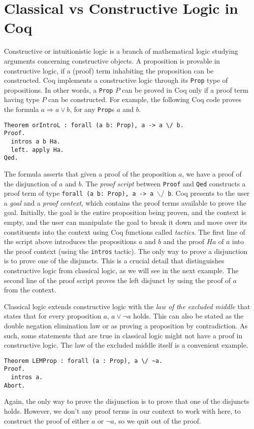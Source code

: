 \documentclass[11pt]{article}
\begin{document}
	\section{Classical vs Constructive Logic in Coq}
	\label{sec:logic}
	Constructive or intuitionistic logic 
	is a branch of mathematical logic 
	studying arguments concerning 
	constructive objects. A proposition 
	is provable in constructive logic, if 
	a (proof) term inhabiting the 
	proposition can be constructed. 
	Coq implements a constructive 
	logic through its \texttt{Prop}
	type of propositions. In other words,
	a \texttt{Prop} $P$ can be proved in 
	Coq only if a proof term having 
	type $P$ can be constructed.
	For example, the following Coq
	code proves the formula
	$a \Rightarrow a \lor b$, for any 
	\texttt{Prop}s $a$ and $b$.
	\begin{verbatim}
Theorem orIntroL : forall (a b: Prop), a -> a \/ b.
Proof.
  intros a b Ha.
  left. apply Ha.
Qed.
	\end{verbatim}
	The formula asserts that given a 
	proof of the proposition $a$, we
	have a proof of the 
	disjunction of $a$ and $b$. The 
	\textit{proof script} between 
	\texttt{Proof} 
	and \texttt{Qed} constructs a 
	proof term of type \texttt{forall 
	(a b: Prop), a -> a $\backslash/$ b}. 
	Coq presents to the user a 
	\textit{goal} and a \textit{proof 
	context}, which contains the proof 
	terms available to prove the goal.
	Initially, the goal is the entire 
	proposition being proven, and the 
	context is empty, and the user
	can manipulate the goal to break 
	it down and move over its 
	constituents into the context
	using Coq functions called 
	\textit{tactics}. The first line of the 
	script above introduces 
	the propositions $a$ and $b$ and the 
	proof $Ha$ of $a$ into the 
	proof context (using the \texttt{intros}
	tactic). The only way to prove a 
	disjunction is to prove one 
	of the disjuncts. This is a crucial
	detail that distinguishes constructive
	logic from classical logic, as we 
	will see in the next example. 
	The second line of the proof script 
	proves the left disjunct by using 
	the proof of $a$ from the context.
	
	Classical logic extends 
	constructive logic with the 
	\textit{law of the excluded 
	middle} that states that for 
	every proposition $a$, 
	$a \lor \neg a$ holds. This can 
	also be stated as the 
	double negation elimination 
	law or as proving a 
	proposition by contradiction. As
	such, some statements that are true 
	in classical logic might not have 
	a proof in constructive logic.
	The law of the excluded middle
	itself is a convenient example.
	\begin{verbatim}
Theorem LEMProp : forall (a : Prop), a \/ ~a.
Proof.
  intros a. 
Abort.
	\end{verbatim}
	Again, the only way to prove the 
	disjunction is to prove that one 
	of the disjuncts holds. However, 
	we don't any proof terms in our
	context to work 
	with here, to construct the 
	proof of either $a$ or $\neg a$,
	so we quit out of the proof.
	
\end{document}
